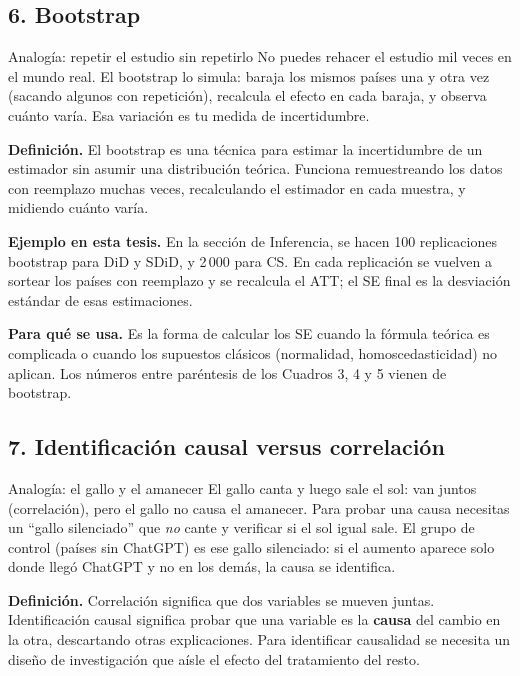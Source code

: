 \documentclass[11pt,a4paper]{article}
\begin{document}
\subsection*{6. Bootstrap}

\begin{ideabox}{Analogía: repetir el estudio sin repetirlo}
No puedes rehacer el estudio mil veces en el mundo real. El bootstrap lo simula: baraja los mismos países una y otra vez (sacando algunos con repetición), recalcula el efecto en cada baraja, y observa cuánto varía. Esa variación es tu medida de incertidumbre.
\end{ideabox}

\textbf{Definición.} El bootstrap es una técnica para estimar la incertidumbre de un estimador sin asumir una distribución teórica. Funciona remuestreando los datos con reemplazo muchas veces, recalculando el estimador en cada muestra, y midiendo cuánto varía.

\textbf{Ejemplo en esta tesis.} En la sección de Inferencia, se hacen 100 replicaciones bootstrap para DiD y SDiD, y 2\,000 para CS. En cada replicación se vuelven a sortear los países con reemplazo y se recalcula el ATT; el SE final es la desviación estándar de esas estimaciones.

\textbf{Para qué se usa.} Es la forma de calcular los SE cuando la fórmula teórica es complicada o cuando los supuestos clásicos (normalidad, homoscedasticidad) no aplican. Los números entre paréntesis de los Cuadros 3, 4 y 5 vienen de bootstrap.

\subsection*{7. Identificación causal versus correlación}

\begin{ideabox}{Analogía: el gallo y el amanecer}
El gallo canta y luego sale el sol: van juntos (correlación), pero el gallo no causa el amanecer. Para probar una causa necesitas un ``gallo silenciado'' que \emph{no} cante y verificar si el sol igual sale. El grupo de control (países sin ChatGPT) es ese gallo silenciado: si el aumento aparece solo donde llegó ChatGPT y no en los demás, la causa se identifica.
\end{ideabox}

\textbf{Definición.} Correlación significa que dos variables se mueven juntas. Identificación causal significa probar que una variable es la \textbf{causa} del cambio en la otra, descartando otras explicaciones. Para identificar causalidad se necesita un diseño de investigación que aísle el efecto del tratamiento del resto.
\end{document}
